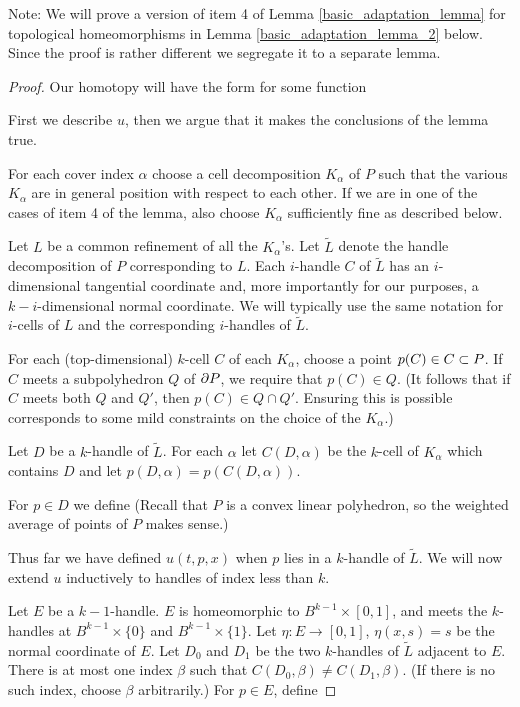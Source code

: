 Note: We will prove a version of item 4 of Lemma \ref{basic_adaptation_lemma} for topological
homeomorphisms in Lemma \ref{basic_adaptation_lemma_2} below.
Since the proof is rather different we segregate it to a separate lemma.

\begin{proof}
Our homotopy will have the form
for some function

First we describe $u$, then we argue that it makes the conclusions of the lemma true.

For each cover index $\alpha$ choose a cell decomposition $K_\alpha$ of $P$
such that the various $K_\alpha$ are in general position with respect to each other.
If we are in one of the cases of item 4 of the lemma, also choose $K_\alpha$
sufficiently fine as described below.

\def\jj{\tilde{L}}
Let $L$ be a common refinement of all the $K_\alpha$'s.
Let $\jj$ denote the handle decomposition of $P$ corresponding to $L$.
Each $i$-handle $C$ of $\jj$ has an $i$-dimensional tangential coordinate and,
more importantly for our purposes, a $k{-}i$-dimensional normal coordinate.
We will typically use the same notation for $i$-cells of $L$ and the 
corresponding $i$-handles of $\jj$.

For each (top-dimensional) $k$-cell $C$ of each $K_\alpha$, choose a point $p(C) \in C \subset P$.
If $C$ meets a subpolyhedron $Q$ of $\partial P$, we require that $p(C)\in Q$.
(It follows that if $C$ meets both $Q$ and $Q'$, then $p(C)\in Q\cap Q'$.
Ensuring this is possible corresponds to some mild constraints on the choice of the $K_\alpha$.)

Let $D$ be a $k$-handle of $\jj$.
For each $\alpha$ let $C(D, \alpha)$ be the $k$-cell of $K_\alpha$ which contains $D$
and let $p(D, \alpha) = p(C(D, \alpha))$.

For $p \in D$ we define
(Recall that $P$ is a convex linear polyhedron, so the weighted average of points of $P$
makes sense.)

Thus far we have defined $u(t, p, x)$ when $p$ lies in a $k$-handle of $\jj$.
We will now extend $u$ inductively to handles of index less than $k$.

Let $E$ be a $k{-}1$-handle.
$E$ is homeomorphic to $B^{k-1}\times [0,1]$, and meets
the $k$-handles at $B^{k-1}\times\{0\}$ and $B^{k-1}\times\{1\}$.
Let $\eta : E \to [0,1]$, $\eta(x, s) = s$ be the normal coordinate
of $E$.
Let $D_0$ and $D_1$ be the two $k$-handles of $\jj$ adjacent to $E$.
There is at most one index $\beta$ such that $C(D_0, \beta) \ne C(D_1, \beta)$.
(If there is no such index, choose $\beta$
arbitrarily.)
For $p \in E$, define



\end{proof}
